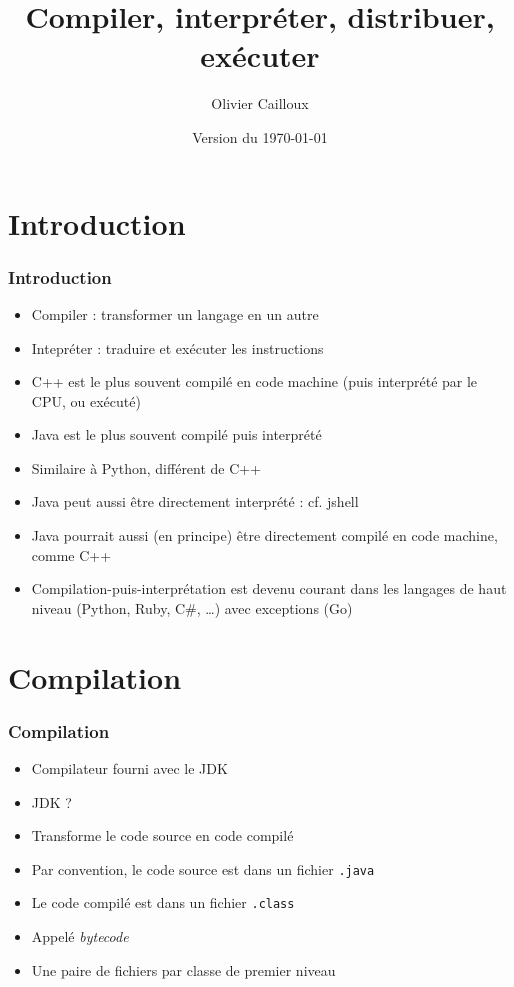 \documentclass[english, french]{beamer}
\title{Compiler, interpréter, distribuer, exécuter}
\author{Olivier Cailloux}
\institute[LAMSADE]{LAMSADE, Université Paris-Dauphine}
\date{Version du \today}
\begin{document}
\begin{frame}[plain]
	\titlepage
\end{frame}
\addtocounter{framenumber}{-1}

\section{Introduction}
\begin{frame}
	\frametitle{Introduction}
	\begin{itemize}
		\item Compiler : transformer un langage en un autre
		\item Intepréter : traduire et exécuter les instructions
		\item C++ est le plus souvent compilé en code machine (puis interprété par le CPU, ou \og{}exécuté\fg{})
		\item Java est le plus souvent compilé puis interprété
		\item Similaire à Python, différent de C++
		\item Java peut aussi être directement interprété : cf. jshell
		\item Java pourrait aussi (en principe) être directement compilé en code machine, comme C++
		\item Compilation-puis-interprétation est devenu courant dans les langages de haut niveau (Python, Ruby, C\#, …) avec exceptions (Go)
	\end{itemize}
\end{frame}

\section{Compilation}
\begin{frame}
	\frametitle{Compilation}
	\begin{itemize}
		\item Compilateur fourni avec le JDK
		\item JDK ? \onslide<2>{Java Development Kit}
		\item Transforme le code source en code compilé
		\item Par convention, le code source est dans un fichier \texttt{.java}
		\item Le code compilé est dans un fichier \texttt{.class}
		\item Appelé \emph{bytecode}
		\item Une paire de fichiers par classe {\tiny de premier niveau}
	\end{itemize}
\end{frame}
\end{document}

